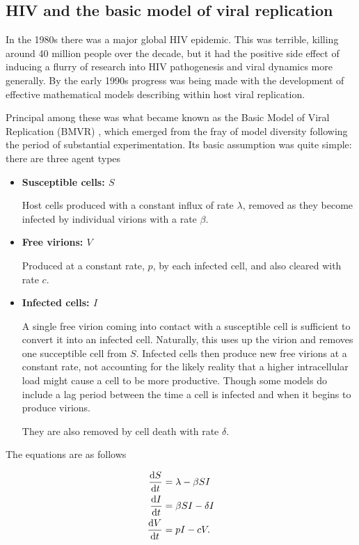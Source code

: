 \subsection{HIV and the basic model of viral replication}
In the 1980s there was a major global HIV epidemic. This was terrible, killing around 40 million people over the decade, but it had the positive side effect of inducing a flurry of research into HIV pathogenesis and viral dynamics more generally. By the early 1990s progress was being made with the development of effective mathematical models describing within host viral replication.\par
Principal among these was what became known as the Basic Model of Viral Replication (BMVR) \cite{mclean1993balance}, which emerged from the fray of model diversity following the period of substantial experimentation. Its basic assumption was quite simple: there are three agent types

\begin{itemize}
\item \textbf{Susceptible cells: $S$} 

Host cells produced with a constant influx of rate $\lambda$, removed as they become infected by individual virions with a rate $\beta$.

\item \textbf{Free virions: $V$}

Produced at a constant rate, $p$, by each infected cell, and also cleared with rate $c$.

\item \textbf{Infected cells: $I$}

A single free virion coming into contact with a susceptible cell is sufficient to convert it into an infected cell. Naturally, this uses up the virion and removes one succeptible cell from $S$. Infected cells then produce new free virions at a constant rate, not accounting for the likely reality that a higher intracellular load might cause a cell to be more productive. Though some models do include a lag period between the time a cell is infected and when it begins to produce virions.\par
They are also removed by cell death with rate $\delta$.
\end{itemize}

\noindent
The equations are as follows

\begin{align*}
\displaystyle\frac{{\rm d} S}{{\rm d} t} & = \lambda - \beta SI\\
\displaystyle\frac{{\rm d} I}{{\rm d} t} & = \beta SI - \delta I\\
\displaystyle\frac{{\rm d} V}{{\rm d} t}& = p I - c V.
\end{align*}

